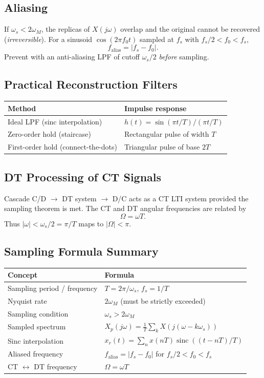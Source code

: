 \documentclass[10pt]{article}
\newcommand{\sinc}{\operatorname{sinc}}
\begin{document}
\subsection{Aliasing}
If $\omega_s<2\omega_M$, the replicas of $X(j\omega)$ overlap and the original
cannot be recovered (\emph{irreversible}). For a sinusoid
$\cos(2\pi f_0 t)$ sampled at $f_s$ with $f_s/2 < f_0 < f_s$,
\[
f_{\text{alias}} = |f_s - f_0|.
\]
Prevent with an anti-aliasing LPF of cutoff $\omega_s/2$ \emph{before} sampling.

\subsection{Practical Reconstruction Filters}
\begin{center}
\begin{tabular}{@{}ll@{}}
\toprule
Method & Impulse response \\
\midrule
Ideal LPF (sinc interpolation) & $h(t) = \sin(\pi t/T)/(\pi t/T)$ \\
Zero-order hold (staircase) & Rectangular pulse of width $T$ \\
First-order hold (connect-the-dots) & Triangular pulse of base $2T$ \\
\bottomrule
\end{tabular}
\end{center}

\subsection{DT Processing of CT Signals}
Cascade C/D $\to$ DT system $\to$ D/C acts as a CT LTI system provided the
sampling theorem is met. The CT and DT angular frequencies are related by
\[
\Omega = \omega T.
\]
Thus $|\omega|<\omega_s/2 = \pi/T$ maps to $|\Omega|<\pi$.

\subsection{Sampling Formula Summary}
\begin{center}
\begin{tabular}{@{}ll@{}}
\toprule
Concept & Formula \\
\midrule
Sampling period / frequency & $T = 2\pi/\omega_s$, $f_s = 1/T$ \\
Nyquist rate & $2\omega_M$ (must be strictly exceeded) \\
Sampling condition & $\omega_s > 2\omega_M$ \\
Sampled spectrum & $X_p(j\omega) = \tfrac{1}{T}\sum_k X(j(\omega-k\omega_s))$ \\
Sinc interpolation & $x_r(t) = \sum_n x(nT)\sinc((t-nT)/T)$ \\
Aliased frequency & $f_{\text{alias}} = |f_s-f_0|$ for $f_s/2<f_0<f_s$ \\
CT $\leftrightarrow$ DT frequency & $\Omega = \omega T$ \\
\bottomrule
\end{tabular}
\end{center}
\end{document}
